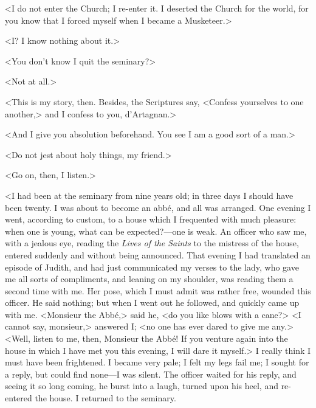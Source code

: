 <I do not enter the Church; I re-enter it. I deserted the Church for the world, for you know that I forced myself when I became a Musketeer.> 

<I? I know nothing about it.> 

<You don't know I quit the seminary?> 

<Not at all.> 

<This is my story, then. Besides, the Scriptures say, <Confess yourselves to one another,> and I confess to you, d'Artagnan.> 

<And I give you absolution beforehand. You see I am a good sort of a man.> 

<Do not jest about holy things, my friend.> 

<Go on, then, I listen.> 

<I had been at the seminary from nine years old; in three days I should have been twenty. I was about to become an abbé, and all was arranged. One evening I went, according to custom, to a house which I frequented with much pleasure: when one is young, what can be expected?---one is weak. An officer who saw me, with a jealous eye, reading the \textit{Lives of the Saints} to the mistress of the house, entered suddenly and without being announced. That evening I had translated an episode of Judith, and had just communicated my verses to the lady, who gave me all sorts of compliments, and leaning on my shoulder, was reading them a second time with me. Her pose, which I must admit was rather free, wounded this officer. He said nothing; but when I went out he followed, and quickly came up with me. <Monsieur the Abbé,> said he, <do you like blows with a cane?> <I cannot say, monsieur,> answered I; <no one has ever dared to give me any.> <Well, listen to me, then, Monsieur the Abbé! If you venture again into the house in which I have met you this evening, I will dare it myself.> I really think I must have been frightened. I became very pale; I felt my legs fail me; I sought for a reply, but could find none---I was silent. The officer waited for his reply, and seeing it so long coming, he burst into a laugh, turned upon his heel, and re-entered the house. I returned to the seminary. 

